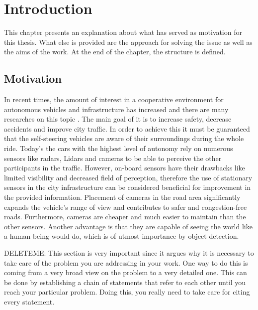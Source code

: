 \chapter{Introduction}
\label{introduction}
This chapter presents an explanation about what has served as motivation for this thesis. What else is provided are the approach for solving the issue as well as the aims of the work. At the end of the chapter, the structure is defined.

\section{Motivation}
In recent times, the amount of interest in a cooperative environment for autonomous vehicles and infrastructure has increased and there are many researches on this topic \cite{ cvis_article_two, cvis_article_one}. The main goal of it is to increase safety, decrease accidents and improve city traffic. In order to achieve this it must be guaranteed that the self-steering vehicles are aware of their surroundings during the whole ride. Today's the cars with the highest level of autonomy rely on numerous sensors like radars, Lidars and cameras to be able to perceive the other participants in the traffic. However, on-board sensors have their drawbacks like limited visibility and decreased field of perception, therefore the use of stationary sensors in the city infrastructure can be considered beneficial for improvement in the provided information. Placement of cameras in the road area significantly expands the vehicle's range of view and contributes to safer and congestion-free roads. Furthermore, cameras are cheaper and much easier to  maintain than the other sensors. Another advantage is that they are capable of seeing the world like a human being would do, which is of utmost importance by object detection.  

DELETEME: This section is very important since it argues why it is necessary to take care of the problem you are addressing in your work. One way to do this is coming from a very broad view on the problem to a very detailed one. This can be done by establishing a chain of statements that refer to each other until you reach your particular problem. Doing this, you really need to take care for citing every statement. 

